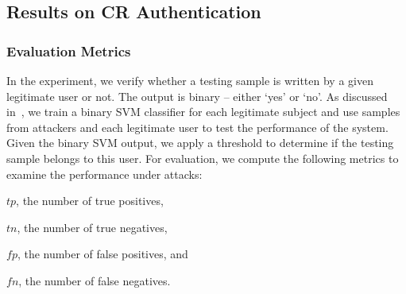 \subsection{Results on CR Authentication}

\subsubsection{Evaluation Metrics}

\indent In the experiment, we verify whether a testing sample is written by a given legitimate user or not. The output is binary -- either `yes' or `no'.
 As discussed in~, we train a binary SVM classifier for each legitimate subject and use samples from attackers and each legitimate user to test the performance of the system. Given the binary SVM output, we apply a threshold to determine if the testing sample belongs to this user. 
For evaluation, we compute the following metrics to examine the performance under attacks:
\begin{inlinenum}
\item $tp$, the number of true positives,
\item $tn$, the number of true negatives, 
\item $fp$, the number of false positives, and 
\item $fn$, the number of false negatives.
\end{inlinenum} 


